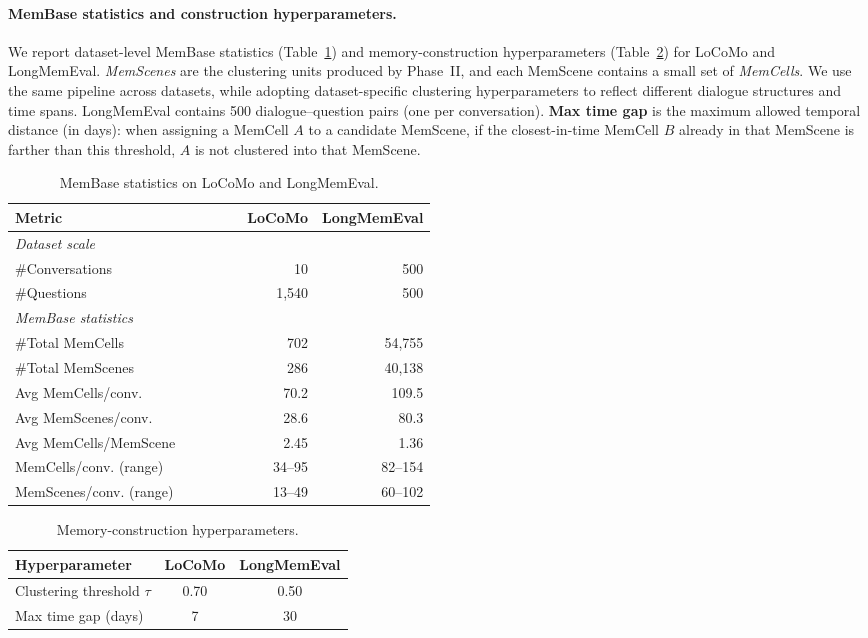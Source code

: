 \paragraph{MemBase statistics and construction hyperparameters.} We report dataset-level MemBase statistics (Table~\ref{tab:membase_stats}) and memory-construction hyperparameters (Table~\ref{tab:membase_hparams}) for LoCoMo and LongMemEval. \textit{MemScenes} are the clustering units produced by Phase~II, and each MemScene contains a small set of \textit{MemCells}. We use the same pipeline across datasets, while adopting dataset-specific clustering hyperparameters to reflect different dialogue structures and time spans. LongMemEval contains 500 dialogue--question pairs (one per conversation). \textbf{Max time gap} is the maximum allowed temporal distance (in days): when assigning a MemCell $A$ to a candidate MemScene, if the closest-in-time MemCell $B$ already in that MemScene is farther than this threshold, $A$ is not clustered into that MemScene.

\begin{table}[t]
\centering
\footnotesize
\setlength{\tabcolsep}{2pt}
\renewcommand{\arraystretch}{1.0}
\caption{MemBase statistics on LoCoMo and LongMemEval.}
\label{tab:membase_stats}
\begin{tabular}{@{}p{0.55\linewidth} r r@{}}
\toprule
\textbf{Metric} & \textbf{LoCoMo} & \textbf{LongMemEval} \\
\midrule
\multicolumn{3}{l}{\textit{Dataset scale}} \\[-2pt]
\#Conversations & 10 & 500 \\
\#Questions & 1{,}540 & 500 \\
\midrule
\multicolumn{3}{l}{\textit{MemBase statistics}} \\[-2pt]
\#Total MemCells & 702 & 54{,}755 \\
\#Total MemScenes & 286 & 40{,}138 \\
Avg MemCells/conv. & 70.2 & 109.5 \\
Avg MemScenes/conv. & 28.6 & 80.3 \\
Avg MemCells/MemScene & 2.45 & 1.36 \\
MemCells/conv. (range) & 34--95 & 82--154 \\
MemScenes/conv. (range) & 13--49 & 60--102 \\
\bottomrule
\end{tabular}
\end{table}

\begin{table}[t]
\centering
\footnotesize
\setlength{\tabcolsep}{6pt}
\renewcommand{\arraystretch}{1.0}
\caption{Memory-construction hyperparameters.}
\label{tab:membase_hparams}
\begin{tabular}{@{}l c c@{}}
\toprule
\textbf{Hyperparameter} & \textbf{LoCoMo} & \textbf{LongMemEval} \\
\midrule
Clustering threshold $\tau$ & 0.70 & 0.50 \\
Max time gap (days) & 7 & 30 \\
\bottomrule
\end{tabular}
\end{table}

